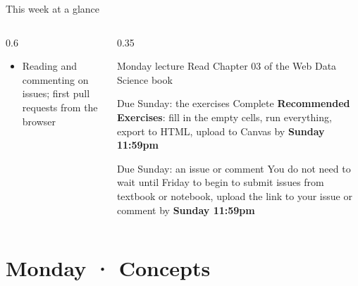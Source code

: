\documentclass[9pt,aspectratio=169]{beamer}
\begin{document}
\begin{frame}{This week at a glance}
\begin{columns}[T]
\begin{column}{0.6\textwidth}
            \begin{itemize}\small
                \item Reading and commenting on issues; first pull requests from the browser
            \end{itemize}
        \end{column}
        \begin{column}{0.35\textwidth}
            \begin{alertblock}{Monday lecture}
                \small Read Chapter 03 of the Web Data Science book
            \end{alertblock}
            \begin{alertblock}{Due Sunday: the exercises}
                \small Complete \textbf{Recommended Exercises}: fill in the empty cells, run everything, export to HTML, upload to Canvas by \textbf{Sunday 11:59pm}
            \end{alertblock}
            \begin{alertblock}{Due Sunday: an issue or comment}
                \small You do not need to wait until Friday to begin to submit issues from textbook or notebook, upload the link to your issue or comment by \textbf{Sunday 11:59pm}
            \end{alertblock}
        \end{column}
    \end{columns}
\end{frame}

\section{Monday · Concepts}
\end{document}
